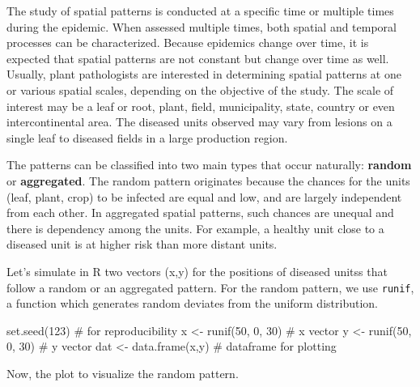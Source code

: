 \documentclass[
  letterpaper,
  DIV=11,
  numbers=noendperiod]{scrreprt}
\newenvironment{Shaded}{\begin{snugshade}}{\end{snugshade}}
\newcommand{\CommentTok}[1]{\textcolor[rgb]{0.37,0.37,0.37}{#1}}
\newcommand{\DecValTok}[1]{\textcolor[rgb]{0.68,0.00,0.00}{#1}}
\newcommand{\FunctionTok}[1]{\textcolor[rgb]{0.28,0.35,0.67}{#1}}
\newcommand{\NormalTok}[1]{\textcolor[rgb]{0.00,0.23,0.31}{#1}}
\newcommand{\OtherTok}[1]{\textcolor[rgb]{0.00,0.23,0.31}{#1}}
\begin{document}
The study of spatial patterns is conducted at a specific time or
multiple times during the epidemic. When assessed multiple times, both
spatial and temporal processes can be characterized. Because epidemics
change over time, it is expected that spatial patterns are not constant
but change over time as well. Usually, plant pathologists are interested
in determining spatial patterns at one or various spatial scales,
depending on the objective of the study. The scale of interest may be a
leaf or root, plant, field, municipality, state, country or even
intercontinental area. The diseased units observed may vary from lesions
on a single leaf to diseased fields in a large production region.

The patterns can be classified into two main types that occur naturally:
\textbf{random} or \textbf{aggregated}. The random pattern originates
because the chances for the units (leaf, plant, crop) to be infected are
equal and low, and are largely independent from each other. In
aggregated spatial patterns, such chances are unequal and there is
dependency among the units. For example, a healthy unit close to a
diseased unit is at higher risk than more distant units.

Let's simulate in R two vectors (x,y) for the positions of diseased
unitss that follow a random or an aggregated pattern. For the random
pattern, we use \texttt{runif}, a function which generates random
deviates from the uniform distribution.

\begin{Shaded}
\begin{Highlighting}[]
\FunctionTok{set.seed}\NormalTok{(}\DecValTok{123}\NormalTok{)          }\CommentTok{\# for reproducibility}
\NormalTok{x }\OtherTok{\textless{}{-}} \FunctionTok{runif}\NormalTok{(}\DecValTok{50}\NormalTok{, }\DecValTok{0}\NormalTok{, }\DecValTok{30}\NormalTok{)  }\CommentTok{\# x vector}
\NormalTok{y }\OtherTok{\textless{}{-}} \FunctionTok{runif}\NormalTok{(}\DecValTok{50}\NormalTok{, }\DecValTok{0}\NormalTok{, }\DecValTok{30}\NormalTok{)  }\CommentTok{\# y vector}
\NormalTok{dat }\OtherTok{\textless{}{-}} \FunctionTok{data.frame}\NormalTok{(x,y) }\CommentTok{\# dataframe for plotting}
\end{Highlighting}
\end{Shaded}

Now, the plot to visualize the random pattern.
\end{document}
